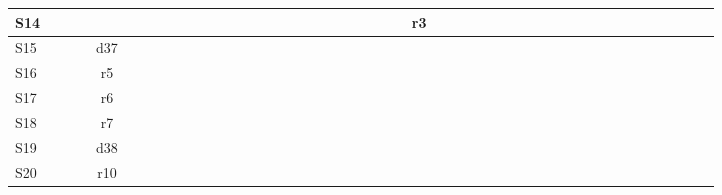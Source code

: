 \begin{minipage}{\linewidth}
\begin{turn}{90}
{\begin{tabular}{|l|c|c|c|c|c|c|c|c|c|c|c|c|c|c|c|c|c|c|c|c|c|c|c|c|c||c|c|c|c|c|c|c|c|c|c|c|c|c|c|c|c|c|c|c|c|}
    \midrule
    S14   &       &       &       &       &       &       &       &       &       &       &       &       &       &       &       &       &       &       &       &       &       &       &       &       & r3    &       &       &       &       &       &       &       &       &       &       &       &       &       &       &       &       &       &       &       &  \\
    \midrule
    S15   &       &       &       & d37   &       &       &       &       &       &       &       &       &       &       &       &       &       &       &       &       &       &       &       &       &       &       &       &       &       &       &       &       &       &       &       &       &       &       &       &       &       &       &       &       &  \\
    \midrule
    S16   &       &       &       & r5    &       &       &       &       &       &       &       &       &       &       &       &       &       &       &       &       &       &       &       &       &       &       &       &       &       &       &       &       &       &       &       &       &       &       &       &       &       &       &       &       &  \\
    \midrule
    S17   &       &       &       & r6    &       &       &       &       &       &       &       &       &       &       &       &       &       &       &       &       &       &       &       &       &       &       &       &       &       &       &       &       &       &       &       &       &       &       &       &       &       &       &       &       &  \\
    \midrule
    S18   &       &       &       & r7    &       &       &       &       &       &       &       &       &       &       &       &       &       &       &       &       &       &       &       &       &       &       &       &       &       &       &       &       &       &       &       &       &       &       &       &       &       &       &       &       &  \\
    \midrule
    S19   &       &       &       & d38   &       &       &       &       &       &       &       &       &       &       &       &       &       &       &       &       &       &       &       &       &       &       &       &       &       &       &       &       &       &       &       &       &       &       &       &       &       &       &       &       &  \\
    \midrule
    S20   &       &       &       & r10   &       &       &       &       &       &       &       &       &       &       &       &       &       &       &       &       &       &       &       &       &       &       &       &       &       &       &       &       &       &       &       &       &       &       &       &       &       &       &       &       &  \\

\end{tabular}}
\end{turn}
\end{minipage}
